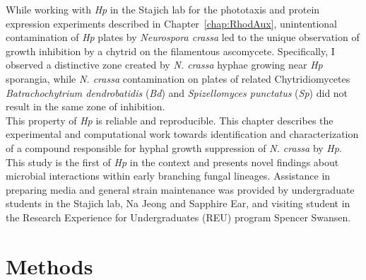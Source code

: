 \indent While working with \textit{Hp} in the Stajich lab for the phototaxis and protein expression experiments described in Chapter~\ref{chap:RhodAux}, unintentional contamination of \textit{Hp} plates by \textit{Neurospora crassa} led to the unique observation of growth inhibition by a chytrid on the filamentous ascomycete. Specifically, I observed a distinctive zone created by \textit{N. crassa} hyphae growing near \textit{Hp} sporangia, while \textit{N. crassa} contamination on plates of related Chytridiomycetes \textit{Batrachochytrium dendrobatidis} (\textit{Bd}) and \textit{Spizellomyces punctatus} (\textit{Sp}) did not result in the same zone of inhibition.\\
\indent This property of \textit{Hp} is reliable and reproducible. This chapter describes the experimental and computational work towards identification and characterization of a compound responsible for hyphal growth suppression of \textit{N. crassa} by \textit{Hp}. This study is the first of \textit{Hp} in the context and presents novel findings about microbial interactions within early branching fungal lineages. Assistance in preparing media and general strain maintenance was provided by undergraduate students in the Stajich lab, Na Jeong and Sapphire Ear, and visiting student in the Research Experience for Undergraduates (REU) program Spencer Swansen.\\

\section{Methods}

